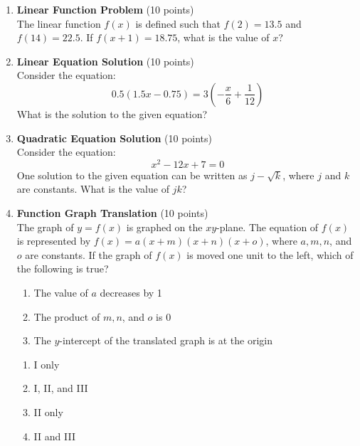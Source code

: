 \begin{enumerate}
  \item \textbf{Linear Function Problem} (10 points)\\
  The linear function $f(x)$ is defined such that $f(2)=13.5$ and $f(14)=22.5$. If $f(x+1)=18.75$, what is the value of $x$?
  \begin{subanswer}
  \end{subanswer}


  \item \textbf{Linear Equation Solution} (10 points)\\
  Consider the equation:
  \[
    0.5(1.5 x-0.75)=3\left(-\frac{x}{6}+\frac{1}{12}\right)
  \]
  What is the solution to the given equation?
  \begin{subanswer}
  \end{subanswer}


  \item \textbf{Quadratic Equation Solution} (10 points)\\
  Consider the equation:
  \[
    x^2-12 x+7=0
  \]
  One solution to the given equation can be written as $j-\sqrt{k}$, where $j$ and $k$ are constants. What is the value of $jk$?
  \begin{subanswer}
  \end{subanswer}


  \newpage

  \item \textbf{Function Graph Translation} (10 points)\\
  The graph of $y=f(x)$ is graphed on the $xy$-plane. The equation of $f(x)$ is represented by $f(x)=a(x+m)(x+n)(x+o)$, where $a, m, n$, and $o$ are constants. If the graph of $f(x)$ is moved one unit to the left, which of the following is true?
  \begin{enumerate}[label=(\Roman*)]
    \item The value of $a$ decreases by 1
    \item The product of $m, n$, and $o$ is 0
    \item The $y$-intercept of the translated graph is at the origin
  \end{enumerate}
  \begin{enumerate}[label=(\Alph*)]
    \item I only
    \item I, II, and III
    \item II only
    \item II and III
  \end{enumerate}
  \begin{subanswer}
  \end{subanswer}


\end{enumerate}
